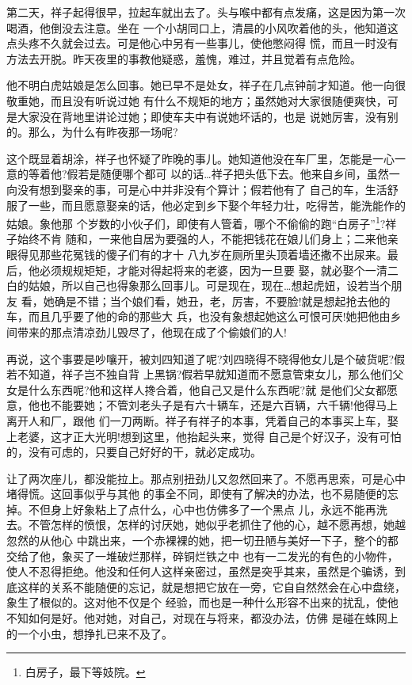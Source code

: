 \documentclass[11pt,a4paper,onecolumn]{article}
\begin{document}
第二天，祥子起得很早，拉起车就出去了。头与喉中都有点发痛，这是因为第一次喝酒，他倒没去注意。坐在
一个小胡同口上，清晨的小风吹着他的头，他知道这点头疼不久就会过去。可是他心中另有一些事儿，使他憋闷得
慌，而且一时没有方法去开脱。昨天夜里的事教他疑惑，羞愧，难过，并且觉着有点危险。

他不明白虎姑娘是怎么回事。她已早不是处女，祥子在几点钟前才知道。他一向很敬重她，而且没有听说过她
有什么不规矩的地方；虽然她对大家很随便爽快，可是大家没在背地里讲论过她；即使车夫中有说她坏话的，也是
说她厉害，没有别的。那么，为什么有昨夜那一场呢?

这个既显着胡涂，祥子也怀疑了昨晚的事儿。她知道他没在车厂里，怎能是一心一意的等着他?假若是随便哪个都可
以的话\ldots 祥子把头低下去。他来自乡间，虽然一向没有想到娶亲的事，可是心中并非没有个算计；假若他有了
自己的车，生活舒服了一些，而且愿意娶亲的话，他必定到乡下娶个年轻力壮，吃得苦，能洗能作的姑娘。象他那
个岁数的小伙子们，即使有人管着，哪个不偷偷的跑``白房子''\footnote{白房子，最下等妓院。}?祥子始终不肯
随和，一来他自居为要强的人，不能把钱花在娘儿们身上；二来他亲眼得见那些花冤钱的傻子们\myrule 有的才十
八九岁\myrule 在厕所里头顶着墙还撒不出尿来。最后，他必须规规矩矩，才能对得起将来的老婆，因为一旦要
娶，就必娶个一清二白的姑娘，所以自己也得象那么回事儿。可是现在，现在\ldots 想起虎妞，设若当个朋友
看，她确是不错；当个娘们看，她丑，老，厉害，不要脸!就是想起抢去他的车，而且几乎要了他的命的那些大
兵，也没有象想起她这么可恨可厌!她把他由乡间带来的那点清凉劲儿毁尽了，他现在成了个偷娘们的人!

再说，这个事要是吵嚷开，被刘四知道了呢?刘四晓得不晓得他女儿是个破货呢?假若不知道，祥子岂不独自背
上黑锅?假若早就知道而不愿意管束女儿，那么他们父女是什么东西呢?他和这样人搀合着，他自己又是什么东西呢?就
是他们父女都愿意，他也不能要她；不管刘老头子是有六十辆车，还是六百辆，六千辆!他得马上离开人和厂，跟他
们一刀两断。祥子有祥子的本事，凭着自己的本事买上车，娶上老婆，这才正大光明!想到这里，他抬起头来，觉得
自己是个好汉子，没有可怕的，没有可虑的，只要自己好好的干，就必定成功。

让了两次座儿，都没能拉上。那点别扭劲儿又忽然回来了。不愿再思索，可是心中堵得慌。这回事似乎与其他
的事全不同，即使有了解决的办法，也不易随便的忘掉。不但身上好象粘上了点什么，心中也仿佛多了一个黑点
儿，永远不能再洗去。不管怎样的愤恨，怎样的讨厌她，她似乎老抓住了他的心，越不愿再想，她越忽然的从他心
中跳出来，一个赤裸裸的她，把一切丑陋与美好一下子，整个的都交给了他，象买了一堆破烂那样，碎铜烂铁之中
也有一二发光的有色的小物件，使人不忍得拒绝。他没和任何人这样亲密过，虽然是突乎其来，虽然是个骗诱，到
底这样的关系不能随便的忘记，就是想把它放在一旁，它自自然然会在心中盘绕，象生了根似的。这对他不仅是个
经验，而也是一种什么形容不出来的扰乱，使他不知如何是好。他对她，对自己，对现在与将来，都没办法，仿佛
是碰在蛛网上的一个小虫，想挣扎已来不及了。
\end{document}
